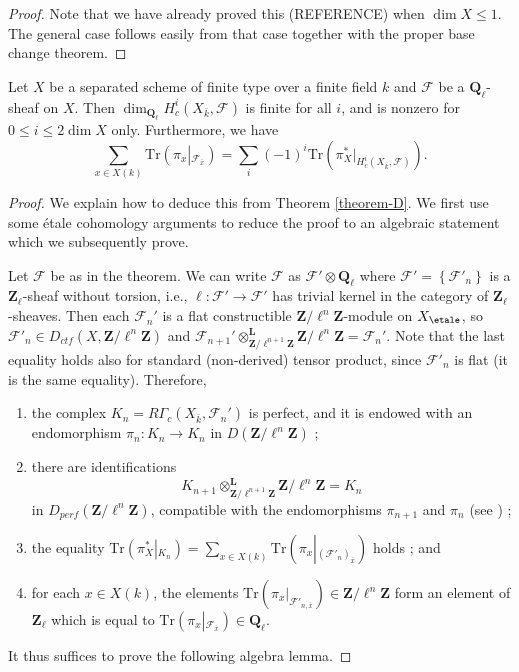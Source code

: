 \begin{proof}
Note that we have already proved this (REFERENCE) when $\dim X \leq 1$. The
general case follows easily from that case together with the proper base change
theorem.
\end{proof}

\begin{theorem}
\label{theorem-C}
Let $X$ be a separated scheme of finite type over a finite field $k$ and
$\mathcal{F}$ be a $\mathbf{Q}_\ell$-sheaf on $X$. Then
$\dim_{\mathbf{Q}_\ell}H_c^i(X_{\bar k}, \mathcal{F})$ is finite for all $i$,
and is nonzero for $0\leq i \leq 2 \dim X$ only. Furthermore, we have
$$
\sum_{x\in X(k)} \text{Tr}\left(\pi_x\left|_{\mathcal{F}_{\bar
x}}\right.\right) = \sum_i (-1)^i\text{Tr}\left(\pi_X^*\big|_{H_c^i(X_{\bar k},
\mathcal{F})}\right).
$$
\end{theorem}

\begin{proof}
We explain how to deduce this from Theorem \ref{theorem-D}.
We first use some \'etale cohomology arguments to reduce the proof
to an algebraic statement which we subsequently prove.

\medskip\noindent
Let $\mathcal{F}$ be as in the theorem. We can write
$\mathcal{F}$ as
$\mathcal{F}'\otimes \mathbf{Q}_\ell$ where $\mathcal{F}' =
\left\{\mathcal{F}'_n\right\}$ is a $\mathbf{Z}_\ell$-sheaf without torsion,
i.e., $\ell : \mathcal{F}'\to \mathcal{F}'$ has trivial kernel in the
category of $\mathbf{Z}_\ell$-sheaves. Then each $\mathcal{F}_n'$ is a flat
constructible $\mathbf{Z}/\ell^n\mathbf{Z}$-module on $X_\etale$, so
$\mathcal{F}'_n \in D_{ctf}(X, \mathbf{Z}/\ell^n\mathbf{Z})$ and
$\mathcal{F}_{n+1}'
\otimes^{\mathbf{L}}_{\mathbf{Z}/\ell^{n+1}\mathbf{Z}}
\mathbf{Z}/\ell^n\mathbf{Z} = \mathcal{F}_n'$.
Note that the last equality holds also
for standard (non-derived) tensor product, since $\mathcal{F}'_n$ is flat
(it is the same equality). Therefore,
\begin{enumerate}
\item
the complex $K_n= R\Gamma_c\left(X_{\bar k}, \mathcal{F}_n'\right)$ is perfect,
and it is endowed with an endomorphism $\pi_n: K_n\to K_n$ in
$D(\mathbf{Z}/\ell^n\mathbf{Z})$ ;
\item
there are identifications
$$
K_{n+1}
\otimes^{\mathbf{L}}_{\mathbf{Z}/\ell^{n+1}\mathbf{Z}}
\mathbf{Z}/\ell^n\mathbf{Z}
=
K_n
$$
in $D_{perf}(\mathbf{Z}/\ell^n\mathbf{Z})$, compatible with the endomorphisms
$\pi_{n+1}$ and $\pi_n$ (see \cite[Rapport 4.12]{SGA4.5}) ;
\item
the equality $\text{Tr}\left(\pi_X^*\left|_{K_n}\right.\right) = \sum_{x\in
X(k)}\text{Tr}\left(\pi_x\left|_{(\mathcal{F}'_n)_{\bar x}}\right.\right)$
holds ; and
\item
for each $x\in X(k)$, the elements
$\text{Tr}\left(\pi_x\big|_{\mathcal{F}'_{n, \bar x}}\right)
\in \mathbf{Z}/\ell^n\mathbf{Z}$
form an element of
$\mathbf{Z}_\ell$ which is equal to
$\text{Tr}\left(
\pi_x\left|_{\mathcal{F}_{\bar x}}\right.
\right) \in \mathbf{Q}_\ell$.
\end{enumerate}
It thus suffices to prove the following algebra lemma.
\end{proof}

